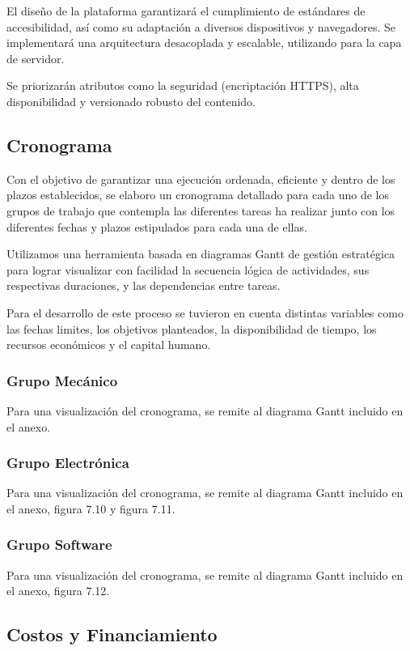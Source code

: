     El diseño de la plataforma garantizará el cumplimiento de estándares de accesibilidad, así como
    su adaptación a diversos dispositivos y navegadores. Se implementará una arquitectura desacoplada
    y escalable, utilizando para la capa de servidor.

    Se priorizarán atributos como la seguridad (encriptación HTTPS), alta disponibilidad y versionado
    robusto del contenido.


  \subsection{Cronograma}
    Con el objetivo de garantizar una ejecución ordenada, eficiente y dentro de los plazos
    establecidos, se elaboro un cronograma detallado para cada uno de los grupos de trabajo que
    contempla las diferentes tareas ha realizar junto con los diferentes fechas y plazos estipulados
    para cada una de ellas.

    Utilizamos una herramienta basada en diagramas Gantt de gestión estratégica para lograr
    visualizar con facilidad la secuencia lógica de actividades, sus respectivas duraciones, y las
    dependencias entre tareas.

    Para el desarrollo de este proceso se tuvieron en cuenta distintas variables como las fechas
    limites, los objetivos planteados, la disponibilidad de tiempo, los recursos económicos y el
    capital humano.

    \subsubsection{Grupo Mecánico}
    Para una visualización del cronograma, se remite al diagrama Gantt incluido en el anexo.
    \subsubsection{Grupo Electrónica}
    Para una visualización del cronograma, se remite al diagrama Gantt incluido en el anexo,
    figura 7.10 y figura 7.11.
    \subsubsection{Grupo Software}
    Para una visualización del cronograma, se remite al diagrama Gantt incluido en el anexo,
    figura 7.12.

  \subsection{Costos y Financiamiento}

